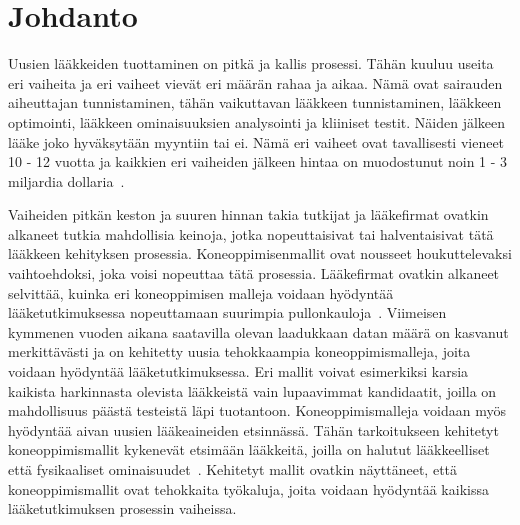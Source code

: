 \documentclass[finnish,twoside,censored,tkt,sw-line]{HYthesisML}
\begin{document}
\newpage
\mytableofcontents
\mainmatter


%
%
%
% 


\chapter{Johdanto}

Uusien lääkkeiden tuottaminen on pitkä ja kallis prosessi.
Tähän kuuluu useita eri vaiheita ja eri vaiheet vievät eri määrän rahaa ja aikaa.
Nämä ovat sairauden aiheuttajan tunnistaminen, tähän vaikuttavan lääkkeen tunnistaminen, lääkkeen optimointi, lääkkeen ominaisuuksien analysointi ja kliiniset testit.
Näiden jälkeen lääke joko hyväksytään myyntiin tai ei.
Nämä eri vaiheet ovat tavallisesti vieneet 10 - 12 vuotta ja kaikkien eri vaiheiden jälkeen hintaa on muodostunut noin 1 - 3 miljardia dollaria~\cite{EkinsSean2019Emlf}.

Vaiheiden pitkän keston ja suuren hinnan takia tutkijat ja lääkefirmat ovatkin alkaneet tutkia mahdollisia keinoja, jotka nopeuttaisivat tai halventaisivat tätä lääkkeen kehityksen prosessia.
Koneoppimisenmallit ovat nousseet houkuttelevaksi vaihtoehdoksi, joka voisi nopeuttaa tätä prosessia.
Lääkefirmat ovatkin alkaneet selvittää, kuinka eri koneoppimisen malleja voidaan hyödyntää lääketutkimuksessa nopeuttamaan suurimpia pullonkauloja~\cite{EkinsSean2019Emlf}.
Viimeisen kymmenen vuoden aikana saatavilla olevan laadukkaan datan määrä on kasvanut merkittävästi ja on kehitetty uusia tehokkaampia koneoppimismalleja, joita voidaan hyödyntää lääketutkimuksessa.
Eri mallit voivat esimerkiksi karsia kaikista harkinnasta olevista lääkkeistä vain lupaavimmat kandidaatit, joilla on mahdollisuus päästä testeistä läpi tuotantoon.
Koneoppimismalleja voidaan myös hyödyntää aivan uusien lääkeaineiden etsinnässä.
Tähän tarkoitukseen kehitetyt koneoppimismallit kykenevät etsimään lääkkeitä, joilla on halutut lääkkeelliset että fysikaaliset ominaisuudet~\cite{VamathevanJessica2019Aoml}.
Kehitetyt mallit ovatkin näyttäneet, että koneoppimismallit ovat tehokkaita työkaluja, joita voidaan hyödyntää kaikissa lääketutkimuksen prosessin vaiheissa.
\end{document}

